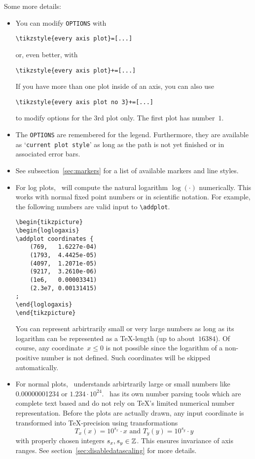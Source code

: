 \noindent
Some more details:
\begin{itemize}
	\item You can modify \texttt{OPTIONS} with
	\begin{lstlisting}[gobble=1]
	\tikzstyle{every axis plot}=[...]
	\end{lstlisting}
	or, even better, with
	\begin{lstlisting}[gobble=1]
	\tikzstyle{every axis plot}+=[...]
	\end{lstlisting}
	If you have more than one plot inside of an axis, you can also use
	\begin{lstlisting}[gobble=1]
	\tikzstyle{every axis plot no 3}+=[...]
	\end{lstlisting}
	to modify options for the 3rd plot only. The first plot has number~$1$.
	\item The \texttt{OPTIONS} are remembered for the legend. Furthermore, they are available as `\texttt{current plot style}' as long as the path is not yet finished or in associated error bars.
	\item See subsection~\ref{sec:markers} for a list of available markers and line styles.
	\item For log plots, \PGFPlots\ will compute the natural logarithm $\log(\cdot)$ numerically. This works with normal fixed point numbers or in scientific notation. For example, the following numbers are valid input to \lstinline!\addplot!.
\begin{lstlisting}
\begin{tikzpicture}
\begin{loglogaxis}
\addplot coordinates {
	(769,	1.6227e-04)
	(1793,	4.4425e-05)
	(4097,	1.2071e-05)
	(9217,	3.2610e-06)
	(1e6,	0.00003341)
	(2.3e7,	0.00131415)
;
\end{loglogaxis}
\end{tikzpicture}
\end{lstlisting}
	You can represent arbirtrarily small or very large numbers as long as its logarithm can be represented as a \TeX-length (up to about~$16384$). Of course, any coordinate~$x\le 0$ is not possible since the logarithm of a non-positive number is not defined. Such coordinates will be skipped automatically.

	\item For normal plots, \PGFPlots\ understands arbirtrarily large or small numbers like 0.00000001234 or $1.234\cdot 10^{24}$. \PGFPlots\ has its own number parsing tools which are complete text based and do not rely on \TeX's limited numerical number representation. Before the plots are actually drawn, any input coordinate is transformed into \TeX-precision using transformations
		\[ T_x(x) = 10^{s_x} \cdot x \text{ and } T_y(y) = 10^{s_y} \cdot y \]
	with properly chosen integers $s_x, s_y \in \mathbb{Z}$. This ensures invariance of axis ranges. See section~\ref{sec:disabledatascaling} for more details.


\end{itemize}
